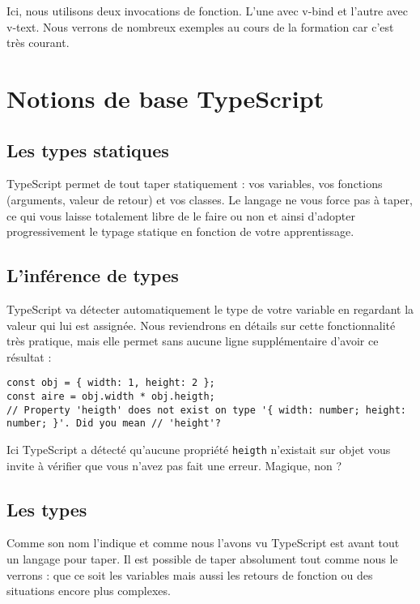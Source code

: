 Ici, nous utilisons deux invocations de fonction. L'une avec {\color{monOrange}v-bind} et l'autre avec {\color{monOrange}v-text}. Nous verrons de nombreux exemples au cours de la formation car c'est très courant.


\section{Notions de base TypeScript}
\subsection{Les types statiques}
{\color{monOrange}TypeScript} permet de tout taper statiquement : vos variables, vos fonctions (arguments, valeur de retour) et vos classes. Le langage ne vous force pas à taper, ce qui vous laisse totalement libre de le faire ou non et ainsi d'adopter progressivement le typage statique en fonction de votre apprentissage.

\subsection{L'inférence de types}
{\color{monOrange}TypeScript}  va détecter automatiquement le type de votre variable en regardant la valeur qui lui est assignée. Nous reviendrons en détails sur cette fonctionnalité très pratique, mais elle permet sans aucune ligne supplémentaire d'avoir ce résultat :
\begin{verbatim}
const obj = { width: 1, height: 2 };
const aire = obj.width * obj.heigth;
// Property 'heigth' does not exist on type '{ width: number; height: number; }'. Did you mean // 'height'?
\end{verbatim}

Ici {\color{monOrange}TypeScript}  a détecté qu'aucune propriété {\tt heigth} n'existait sur objet vous invite à vérifier que vous n'avez pas fait une erreur. Magique, non ?

\subsection{Les types}
Comme son nom l'indique et comme nous l'avons vu {\color{monOrange}TypeScript}  est avant tout un langage pour taper. Il est possible de taper absolument tout comme nous le verrons : que ce soit les variables mais aussi les retours de fonction ou des situations encore plus complexes.

